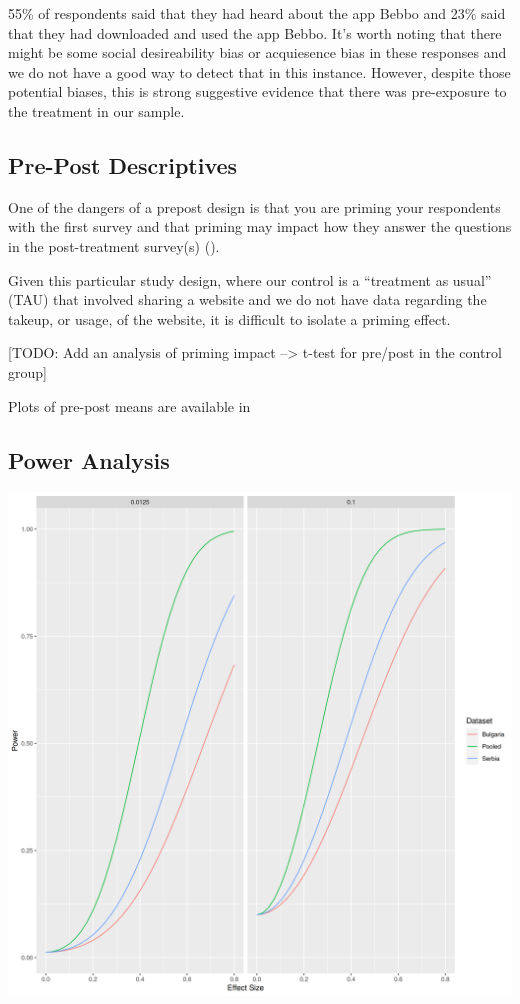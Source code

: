 \documentclass{article}
\begin{document}
55\% of respondents said that they had heard about the app Bebbo and 23\% said that they had downloaded and used the app Bebbo. It's worth noting that there might be some social desireability bias or acquiesence bias in these responses and we do not have a good way to detect that in this instance. However, despite those potential biases, this is strong suggestive evidence that there was pre-exposure to the treatment in our sample.



\subsection*{Pre-Post Descriptives}

One of the dangers of a prepost design is that you are priming your respondents with the first survey and that priming may impact how they answer the questions in the post-treatment survey(s) (\cite{Stantcheva2023}).

Given this particular study design, where our control is a ``treatment as usual'' (TAU) that involved sharing a website and we do not have data regarding the takeup, or usage, of the website, it is difficult to isolate a priming effect.

[TODO: Add an analysis of priming impact --> t-test for pre/post in the control group]

Plots of pre-post means are available in



\subsection*{Power Analysis}

\includegraphics[width=\textwidth]{plots/Power Calculations.png}
\end{document}
